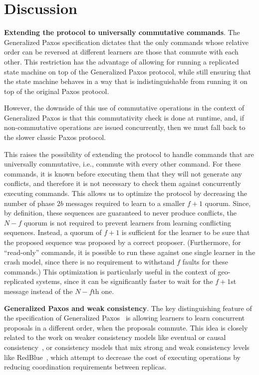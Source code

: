 \section{Discussion}
\label{sec:disc}

\noindent \textbf{Extending the protocol to universally commutative commands}.
The Generalized Paxos specification dictates that the only commands
whose relative order can be reversed at different learners are those
that commute with each other. This restriction has the advantage of
allowing for running a replicated state machine on top of the
Generalized Paxos protocol, while still ensuring that the state
machine behaves in a way that is indistinguishable from running it on
top of the original Paxos protocol.

However, the downside of this use of commutative operations in the
context of Generalized Paxos is that this commutativity check is done
at runtime, and, if non-commutative operations are issued
concurrently, then we must fall back to the slower
classic Paxos protocol.

This raises the possibility of extending the protocol to handle
commands that are universally commutative, i.e., commute with every
other command. For these commands, it is known before executing them
that they will not generate any conflicts, and therefore it is not
necessary to check them against concurrently executing commands.  This
allows us to optimize the protocol by decreasing the number of phase
$2b$ messages required to learn to a smaller $f+1$ quorum. Since, by
definition, these sequences are guaranteed to never produce conflicts,
the $N-f$ quorum is not required to prevent learners from learning
conflicting sequences. Instead, a quorum of $f+1$ is sufficient for
the learner to be sure that the proposed sequence was proposed by a
correct proposer. (Furthermore, for ``read-only'' commands, it is possible to run these
against one single learner in the crash model, since there is no
requirement to withstand $f$ faults for these commands.)
This optimization is particularly useful in the context of 
geo-replicated systems, since it can be significantly faster
to wait for the $f+1$st message instead of the $N-f$th one.


\noindent \textbf{Generalized Paxos and weak consistency}.
The key distinguishing feature of the specification of Generalized
Paxos~\cite{Lamport2005} is allowing learners to learn concurrent
proposals in a different order, when the proposals commute. This idea
is closely related to the work on weaker consistency models like eventual or
causal consistency~\cite{Ahamad1995}, or consistency models that mix
strong and weak consistency levels like RedBlue~\cite{Li2012}, which attempt
to decrease the cost of executing operations by reducing coordination
requirements between replicas. 

